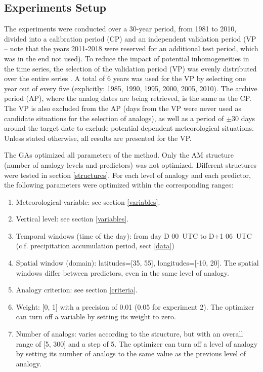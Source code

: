 \documentclass[draft]{agujournal2019}
\begin{document}
\subsection{Experiments Setup}
\label{setup}

The experiments were conducted over a 30-year period, from 1981 to 2010, divided into a calibration period (CP) and an independent validation period (VP -- note that the years 2011-2018 were reserved for an additional test period, which was in the end not used). To reduce the impact of potential inhomogeneities in the time series, the selection of the validation period (VP) was evenly distributed over the entire series \cite<as in>[]{BenDaoud2010}. A total of 6 years was used for the VP by selecting one year out of every five (explicitly: 1985, 1990, 1995, 2000, 2005, 2010). The archive period (AP), where the analog dates are being retrieved, is the same as the CP. The VP is also excluded from the AP (days from the VP were never used as candidate situations for the selection of analogs), as well as a period of $\pm30$ days around the target date to exclude potential dependent meteorological situations. Unless stated otherwise, all results are presented for the VP.

The GAs optimized all parameters of the method. Only the AM structure (number of analogy levels and predictors) was not optimized. Different structures were tested in section \ref{structures}. For each level of analogy and each predictor, the following parameters were optimized within the corresponding ranges:

\begin{enumerate}		
	\item Meteorological variable: see section \ref{variables}.
	\item Vertical level: see section \ref{variables}.
	\item Temporal windows (time of the day): from day D 00~UTC to D+1 06~UTC (c.f. precipitation accumulation period, sect \ref{data})
	\item Spatial window (domain): latitudes=[35, 55], longitudes=[-10, 20]. The spatial windows differ between predictors, even in the same level of analogy.
	\item Analogy criterion: see section \ref{criteria}.
	\item Weight: [0, 1] with a precision of 0.01 (0.05 for experiment 2). The optimizer can turn off a variable by setting its weight to zero.
	\item Number of analogs: varies according to the structure, but with an overall range of [5, 300] and a step of 5. The optimizer can turn off a level of analogy by setting its number of analogs to the same value as the previous level of analogy.
\end{enumerate}
\end{document}
